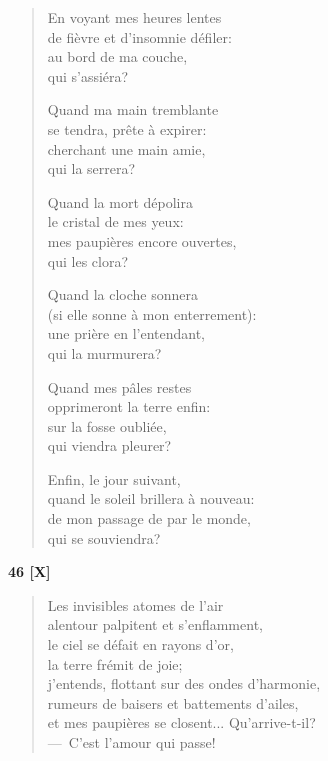 \begin{verse}
  En voyant mes heures lentes \\
  de fièvre et d'insomnie défiler: \\
  au bord de ma couche, \\
  qui s'assiéra?

  Quand ma main tremblante \\
  se tendra, prête à expirer: \\
  cherchant une main amie, \\
  qui la serrera?

  Quand la mort dépolira \\
  le cristal de mes yeux: \\
  mes paupières encore ouvertes, \\
  qui les clora?

  Quand la cloche sonnera \\
  (si elle sonne à mon enterrement): \\
  une prière en l'entendant, \\
  qui la murmurera?

  Quand mes pâles restes \\
  opprimeront la terre enfin: \\
  sur la fosse oubliée, \\
  qui viendra pleurer?

  Enfin, le jour suivant, \\
  quand le soleil brillera à nouveau: \\
  de mon passage de par le monde, \\
  qui se souviendra?
\end{verse}

\pagebreak

\begin{center}
  \textbf{46 [X]}
\end{center}

\begin{verse}
  Les invisibles atomes de l'air \\
  alentour palpitent et s'enflamment, \\
  le ciel se défait en rayons d'or, \\
  la terre frémit de joie; \\
  j'entends, flottant sur des ondes d'harmonie, \\
  rumeurs de baisers et battements d'ailes, \\
  et mes paupières se closent... Qu'arrive-t-il? \\
  ---~C'est l'amour qui passe!
\end{verse}


